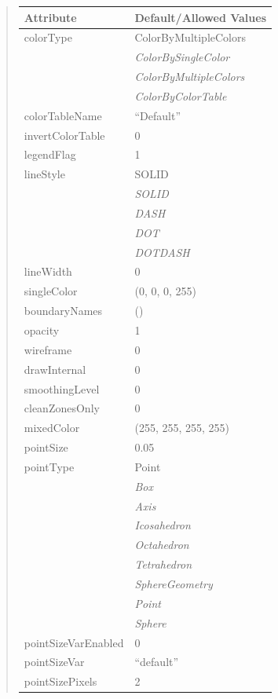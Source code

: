 \documentclass[letterpaper,10pt,english]{sphinxmanual}
\begin{document}
\begin{quote}
\begin{longtable}{|l|l|}
\textbf{Attribute}
 & 
\textbf{Default/Allowed Values}
\\
\hline
colorType
 & 
ColorByMultipleColors
\\
\hline & 
\emph{ColorBySingleColor}
\\
\hline & 
\emph{ColorByMultipleColors}
\\
\hline & 
\emph{ColorByColorTable}
\\
\hline
colorTableName
 & 
``Default''
\\
\hline
invertColorTable
 & 
0
\\
\hline
legendFlag
 & 
1
\\
\hline
lineStyle
 & 
SOLID
\\
\hline & 
\emph{SOLID}
\\
\hline & 
\emph{DASH}
\\
\hline & 
\emph{DOT}
\\
\hline & 
\emph{DOTDASH}
\\
\hline
lineWidth
 & 
0
\\
\hline
singleColor
 & 
(0, 0, 0, 255)
\\
\hline
boundaryNames
 & 
()
\\
\hline
opacity
 & 
1
\\
\hline
wireframe
 & 
0
\\
\hline
drawInternal
 & 
0
\\
\hline
smoothingLevel
 & 
0
\\
\hline
cleanZonesOnly
 & 
0
\\
\hline
mixedColor
 & 
(255, 255, 255, 255)
\\
\hline
pointSize
 & 
0.05
\\
\hline
pointType
 & 
Point
\\
\hline & 
\emph{Box}
\\
\hline & 
\emph{Axis}
\\
\hline & 
\emph{Icosahedron}
\\
\hline & 
\emph{Octahedron}
\\
\hline & 
\emph{Tetrahedron}
\\
\hline & 
\emph{SphereGeometry}
\\
\hline & 
\emph{Point}
\\
\hline & 
\emph{Sphere}
\\
\hline
pointSizeVarEnabled
 & 
0
\\
\hline
pointSizeVar
 & 
``default''
\\
\hline
pointSizePixels
 & 
2
\\
\hline\end{longtable}

\end{quote}
\end{document}
